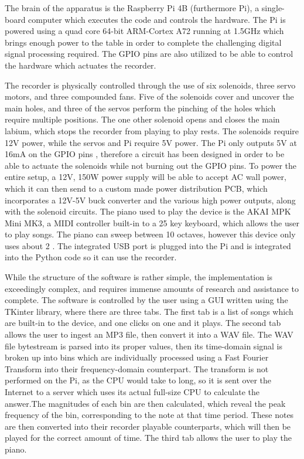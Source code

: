 \documentclass[UTF8, 12pt]{article}
\begin{document}
    The brain of the apparatus is the Raspberry Pi 4B (furthermore Pi), a single-board computer which executes the code and controls the hardware. The Pi is powered using a quad core 64-bit ARM-Cortex A72 running at 1.5GHz \cite{ras_pi} which brings enough power to the table in order to complete the challenging digital signal processing required. The GPIO pins are also utilized to be able to control the hardware which actuates the recorder.

    The recorder is physically controlled through the use of six solenoids, three servo motors, and three compounded fans. Five of the solenoids cover and uncover the main holes, and three of the servos perform the pinching of the holes which require multiple positions. The one other solenoid opens and closes the main labium, which stops the recorder from playing to play rests. The solenoids require 12V power, while the servos and Pi require 5V power. The Pi only outputs 5V at 16mA on the GPIO pins \cite{ras_pi}, therefore a circuit has been designed in order to be able to actuate the solenoids while not burning out the GPIO pins. To power the entire setup, a 12V, 150W power supply will be able to accept AC wall power, which it can then send to a custom made power distribution PCB, which incorporates a 12V-5V buck converter and the various high power outputs, along with the solenoid circuits. The piano used to play the device is the AKAI MPK Mini MK3, a MIDI controller built-in to a 25 key keyboard, which allows the user to play songs. The piano can sweep between 10 octaves, however this device only uses about 2 \cite{piano}. The integrated USB port is plugged into the Pi and is integrated into the Python code so it can use the recorder.

    While the structure of the software is rather simple, the implementation is exceedingly complex, and requires immense amounts of research and assistance to complete. The software is controlled by the user using a GUI written using the TKinter library, where there are three tabs. The first tab is a list of songs which are built-in to the device, and one clicks on one and it plays. The second tab allows the user to ingest an MP3 file, then convert it into a WAV file. The WAV file bytestream is parsed into its proper values, then its time-domain signal is broken up into bins which are individually processed using a Fast Fourier Transform into their frequency-domain counterpart. The transform is not performed on the Pi, as the CPU would take to long, so it is sent over the Internet to a server which uses its actual full-size CPU to calculate the answer.The magnitudes of each bin are then calculated, which reveal the peak frequency of the bin, corresponding to the note at that time period. These notes are then converted into their recorder playable counterparts, which will then be played for the correct amount of time. The third tab allows the user to play the piano.
\end{document}

